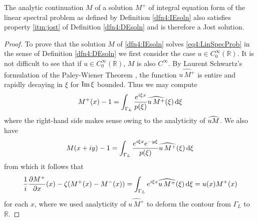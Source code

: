 \documentclass[../dissertation.tex]{subfiles}
\begin{document}
\begin{lma}\label{lma4:IEtoDE5}
	The analytic continuation $M$ of 
	a solution $M^+$ of integral equation form of the linear spectral problem 
	as defined by Definition \ref{dfn4:IEsoln} also satisfies property \ref{itm:jost}
	of Definition \ref{dfn4:DEsoln} and is therefore a Jost solution.
\end{lma}
\begin{proof}
	To prove that the solution $M$ of \eqref{dfn4:IEsoln} solves 
	\eqref{eq4:LinSpecProb} in the sense of Definition \ref{dfn4:DEsoln} we 
	first consider the case $u \in C_0^\infty(\mathbb R)$. It is not difficult to 
	see that if $u \in C_0^\infty(\mathbb R)$, $M$ is also $C^\infty$. By Laurent 
	Schwartz's formulation of the Paley-Wiener Theorem \cite{Schwartz1952}, the 
	function $\widehat{u\,M^+}$ is entire and rapidly decaying in $\xi$ for 
	$\operatorname{Im} \xi$ bounded. Thus we may compute 
	\[ 
		M^+(x) - 1 
			= \int_{\Gamma_L} \frac{e^{i\xi x}}{p(\xi)} \widehat{u\,M^+}(\xi) \, \mathrm{d}\xi
	\]
	where the right-hand side makes sense owing to the analyticity of $\widehat{uM}$. 
	We also have
	\[
		M(x+iy) - 1 
			= 
				\int_{\Gamma_L} 
					\frac{e^{i\xi x} e^{-y\xi}}{p(\xi)} \widehat{u\,M^+}(\xi) 
				\, \mathrm{d}\xi
	\]
	from which it follows that
	\[ 
		\frac{1}{i} \frac{\partial M^+}{\partial x}(x)  - \zeta(M^+(x) - M^-(x))
			=	\int_{\Gamma_L} e^{i\xi x} \widehat{u\,M^+}(\xi) \, \mathrm{d}\xi 
			= u(x) M^+(x)
	\]
	for each $x$, where we used analyticity of $\widehat{u\,M^+}$ to deform the 
	contour from $\Gamma_L$ to $\mathbb R$. 


\end{proof}
\end{document}
